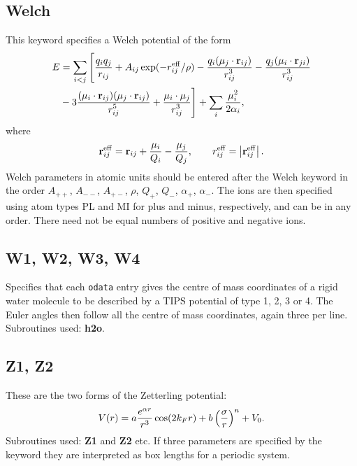 {{{\subsection{Welch}This keyword specifies a Welch potential\cite{welchld76,phillipscb91} of the form
\begin{eqnarray*}
E &= \sum_{i<j}\Bigg[ {\displaystyle q_i q_j\over\displaystyle  r_{ij}} + A_{ij}\exp(-r_{ij}^{\rm eff}/\rho) 
              -{\displaystyle q_i({\bf \mu}_j\cdot{\bf r}_{ij})\over\displaystyle  r_{ij}^3} 
              -{\displaystyle q_j({\bf \mu}_i\cdot{\bf r}_{ji})\over\displaystyle  r_{ij}^3} \\
             &-3{\displaystyle   ({\bf \mu}_i\cdot{\bf r}_{ij})
                   ({\bf \mu}_j\cdot{\bf r}_{ij})\over\displaystyle  r_{ij}^5} 
              +{\displaystyle  {\bf \mu}_i\cdot{\bf \mu}_j\over\displaystyle  r_{ij}^3}\Bigg] 
              +\sum_i {\displaystyle \mu_i^2\over\displaystyle 2\alpha_i}, \\
\end{eqnarray*}
where 
$$ {\bf r}_{ij}^{\rm eff}={\bf r}_{ij}+{{\bf\mu}_i\over Q_i}-{{\bf \mu}_j\over Q_j}, 
    \qquad r_{ij}^{\rm eff}=\left|{\bf r}_{ij}^{\rm eff}\right|. $$
Welch parameters in atomic units should be
entered after the Welch keyword in the order $A_{++}$, $A_{--}$, $A_{+-}$, $\rho$, $Q_+$,
$Q_-$, $\alpha_+$, $\alpha_-$.
The ions are then specified using atom types PL and MI for plus and minus, respectively,
and can be in any order. There need not be equal numbers of positive and negative ions.

\subsection{W1, W2, W3, W4}Specifies that each {\tt odata} entry gives the centre of mass coordinates
of a rigid water molecule to be described by a TIPS potential\cite{jorgensen81} of type 1, 2, 3 or 4.
The Euler angles then follow all the centre of mass coordinates, again three per line.
Subroutines used: {\bf h2o}.

\subsection{Z1, Z2}These are the two forms of the Zetterling potential:\cite{DoyeWZD03}
\begin{equation}
V(r)=a {e^{\alpha r}\over r^3} \cos(2k_F r)+b\left({\sigma\over r}\right)^{n}+V_0.
\end{equation}
Subroutines used: {\bf Z1} and {\bf Z2} etc.
If three parameters are specified by the {} keyword they are interpreted 
as box lengths for a periodic system.

}}}
